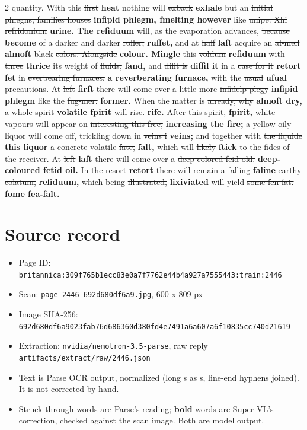 \documentclass[10pt]{article}
\begin{document}
\begin{multicols}{2}
quantity. With this \sout{first} \textbf{heat} nothing will \sout{exback} \textbf{exhale} but an \sout{initial phlegns, families houses} \textbf{infipid phlegm, fmelting however} like \sout{unipe. Xhi refridonium} \textbf{urine. The refiduum} will, as the evaporation advances, \sout{because} \textbf{become} of a darker and darker \sout{roller,} \textbf{ruffet,} and at \sout{half} \textbf{laft} acquire an \sout{al-mell} \textbf{almoft} black \sout{colors. Alongside} \textbf{colour. Mingle} this \sout{voldum} \textbf{refiduum} with \sout{three} \textbf{thrice} its weight of \sout{fluids,} \textbf{fand,} and \sout{dilit is} \textbf{diffil it} in a \sout{case for it} \textbf{retort fet} in \sout{everbearing furnaces,} \textbf{a reverberating furnace,} with the \sout{usual} \textbf{ufual} precautions. At \sout{left} \textbf{firft} there will come over a little more \sout{infidelp plegy} \textbf{infipid phlegm} like the \sout{fug-mer.} \textbf{former.} When the matter is \sout{already, why} \textbf{almoft dry,} a \sout{whole spirit} \textbf{volatile fpirit} will \sout{rise.} \textbf{rife.} After this \sout{spirit,} \textbf{fpirit,} white vapours will appear on \sout{interesting this free,} \textbf{increasing the fire;} a yellow oily liquor will come off, trickling down in \sout{veins i} \textbf{veins;} and together with \sout{the liquide} \textbf{this liquor} a concrete volatile \sout{fate,} \textbf{falt,} which will \sout{likely} \textbf{ftick} to the fides of the receiver. At \sout{left} \textbf{laft} there will come over a \sout{deep-colored feid old.} \textbf{deep-coloured fetid oil.} In the \sout{resort} \textbf{retort} there will remain a \sout{falling} \textbf{faline} earthy \sout{colatum,} \textbf{refiduum,} which being \sout{illustrated,} \textbf{lixiviated} will yield \sout{some fen-fat.} \textbf{fome fea-falt.}
\end{multicols}
\section*{Source record}
\begin{itemize}
\item Page ID: \texttt{britannica:309f765b1ecc83e0a7f7762e44b4a927a7555443:train:2446}
\item Scan: \texttt{page-2446-692d680df6a9.jpg}, 600 x 809 px
\item Image SHA-256: \texttt{\small 692d680df6a9023fab76d686360d380fd4e7491a6a607a6f10835cc740d21619}
\item Extraction: \texttt{nvidia/nemotron-3.5-parse}, raw reply \texttt{artifacts/extract/raw/2446.json}
\item Text is Parse OCR output, normalized (long s as s, line-end hyphens joined). It is not corrected by hand.
\item \sout{Struck-through} words are Parse's reading; \textbf{bold} words are Super VL's correction, checked against the scan image. Both are model output.
\end{itemize}
\end{document}
